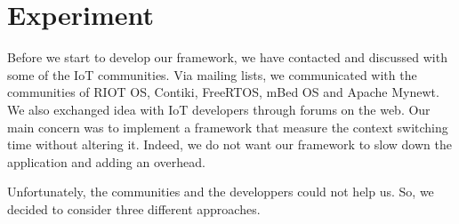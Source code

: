 \chapter{Experiment}

Before we start to develop our framework, we have contacted and discussed with some of the IoT communities.
Via mailing lists, we communicated with the communities of RIOT OS, Contiki, FreeRTOS, mBed OS and Apache Mynewt.
We also exchanged idea with IoT developers through forums on the web.
Our main concern was to implement a framework that measure the context switching time without altering it.
Indeed, we do not want our framework to slow down the application and adding an overhead.

Unfortunately, the communities and the developpers could not help us.
So, we decided to consider three different approaches.



